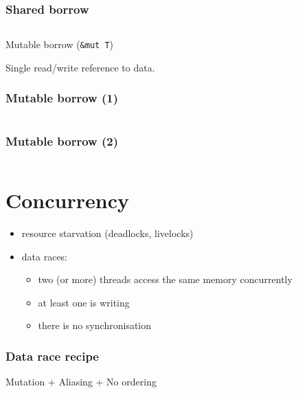 \documentclass{beamer}
\begin{document}
\begin{frame}
    \frametitle{Shared borrow}
    \inputminted[fontsize=\scriptsize]{rust}{code/shared_borrow.rs}
\end{frame}

\begin{frame}
    \begin{center}
        Mutable borrow (\texttt{\&mut T})

        \vspace{3em}

        Single read/write reference to data.
    \end{center}
\end{frame}

\begin{frame}
    \frametitle{Mutable borrow (1)}
    \inputminted[fontsize=\scriptsize]{rust}{code/mutable_borrow1.rs}
\end{frame}

\begin{frame}
    \frametitle{Mutable borrow (2)}
    \inputminted[fontsize=\scriptsize]{rust}{code/mutable_borrow2.rs}
\end{frame}

\section{Concurrency}

\begin{frame}
    \begin{itemize}
            \frametitle{Concurrency Pitfalls}
        \item resource starvation (deadlocks, livelocks)
        \item data races:
            \begin{itemize}
                \item two (or more) threads access the same memory concurrently
                \item at least one is writing
                \item there is no synchronisation
            \end{itemize}
    \end{itemize}
\end{frame}

\begin{frame}
    \frametitle{Data race recipe}
    \begin{center}
        Mutation + Aliasing + No ordering
    \end{center}
\end{frame}
\end{document}
